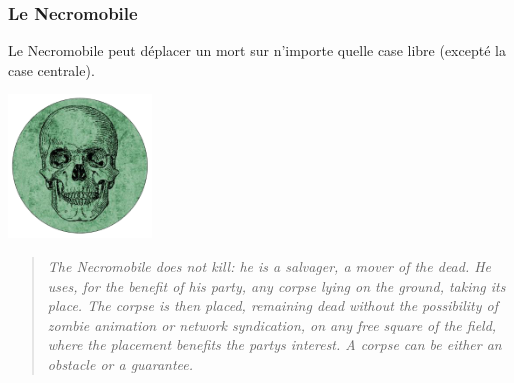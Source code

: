 \documentclass{article}
\begin{document}
\subsubsection{Le Necromobile}
Le Necromobile peut déplacer un mort sur n'importe quelle case libre (excepté la case centrale).

\vspace{5pt} %
\noindent %
\begin{minipage}{0.3\textwidth} %
\includegraphics[width=1.5in,height=1.5in]{media/image6.png}
\end{minipage}%
\hfill %
\begin{minipage}{0.75\textwidth} %

\begin{quote}
\textit{The Necromobile does not kill: he is a salvager, a mover of the dead. He
uses, for the benefit of his party, any corpse lying on the ground,
taking its place. The corpse is then placed, remaining dead without the
possibility of zombie animation or network syndication, on any free
square of the field, where the placement benefits the
party\textquotesingle s interest. A corpse can be either an obstacle or
a guarantee.}
\end{quote}
\end{minipage}
\end{document}
